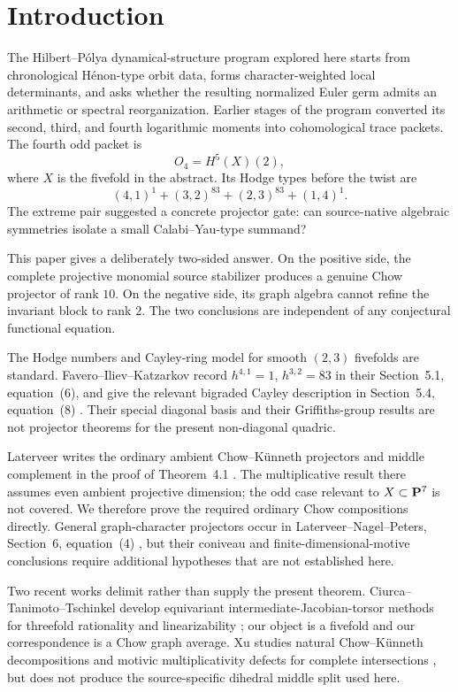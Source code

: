 \section{Introduction}

The Hilbert--P\'olya dynamical-structure program explored here starts
from chronological H\'enon-type orbit data, forms character-weighted
local determinants, and asks whether the resulting normalized Euler germ
admits an arithmetic or spectral reorganization.  Earlier stages of the
program converted its second, third, and fourth logarithmic moments into
cohomological trace packets.  The fourth odd packet is
\[
 O_4=H^5(X)(2),
\]
where \(X\) is the fivefold in the abstract.  Its Hodge types before the
twist are
\[
 (4,1)^1+(3,2)^{83}+(2,3)^{83}+(1,4)^1.
\]
The extreme pair suggested a concrete projector gate: can source-native
algebraic symmetries isolate a small Calabi--Yau-type summand?

This paper gives a deliberately two-sided answer.  On the positive side,
the complete projective monomial source stabilizer produces a genuine
Chow projector of rank \(10\).  On the negative side, its graph algebra
cannot refine the invariant block to rank \(2\).  The two conclusions
are independent of any conjectural functional equation.

The Hodge numbers and Cayley-ring model for smooth \((2,3)\) fivefolds
are standard.  Favero--Iliev--Katzarkov record
\(h^{4,1}=1\), \(h^{3,2}=83\) in their Section~5.1,
equation~(6), and give the relevant bigraded Cayley description in
Section~5.4, equation~(8) \cite{FIK2012}.  Their special diagonal basis
and their Griffiths-group results are not projector theorems for the
present non-diagonal quadric.

Laterveer writes the ordinary ambient Chow--K\"unneth projectors and
middle complement in the proof of Theorem~4.1
\cite{Laterveer2021}.  The multiplicative result there assumes even
ambient projective dimension; the odd case relevant to
\(X\subset\mathbf P^7\) is not covered.  We therefore prove the required
ordinary Chow compositions directly.  General graph-character
projectors occur in Laterveer--Nagel--Peters, Section~6, equation~(4)
\cite{LNP2017}, but their coniveau and finite-dimensional-motive
conclusions require additional hypotheses that are not established
here.

Two recent works delimit rather than supply the present theorem.
Ciurca--Tanimoto--Tschinkel develop equivariant
intermediate-Jacobian-torsor methods for threefold rationality and
linearizability \cite[\S\S2--3 and Theorem~3.3]{CTT2024}; our object is
a fivefold and our correspondence is a Chow graph average.  Xu studies natural
Chow--K\"unneth decompositions and motivic multiplicativity defects for
complete intersections \cite[Theorems~1.4 and~4.19]{Xu2026}, but does
not produce the source-specific dihedral middle split used here.

